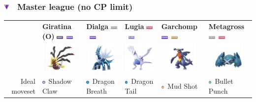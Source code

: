 \documentclass[8pt,aspectratio=169,compress]{beamer}
\newcommand{\flyingfull}{\includegraphics[height=0.15cm]{../../images/type/full/Flying.png}}
\newcommand{\ghostfull}{\includegraphics[height=0.15cm]{../../images/type/full/Ghost.png}}
\newcommand{\dragonfull}{\includegraphics[height=0.15cm]{../../images/type/full/Dragon.png}}
\newcommand{\groundfull}{\includegraphics[height=0.15cm]{../../images/type/full/Ground.png}}
\newcommand{\psychicfull}{\includegraphics[height=0.15cm]{../../images/type/full/Psychic.png}}
\newcommand{\steelfull}{\includegraphics[height=0.15cm]{../../images/type/full/Steel.png}}
\newcommand{\dragonsimp}{\includegraphics[height=0.15cm]{../../images/type/simplified/dragon.png}}
\newcommand{\ghostsimp}{\includegraphics[height=0.15cm]{../../images/type/simplified/ghost.png}}
\newcommand{\groundsimp}{\includegraphics[height=0.15cm]{../../images/type/simplified/ground.png}}
\newcommand{\steelsimp}{\includegraphics[height=0.15cm]{../../images/type/simplified/steel.png}}
\begin{document}
\begin{frame}
\frametitle{\includegraphics[width=0.3cm]{../../pve/guide/master_league.png} ~Master league (no CP limit)}

\begin{tiny}
\begin{block}{}
\begin{center}

\begin{tabular}{rp{2cm}p{2cm}p{2cm}p{2cm}p{2cm}} 
  & \textbf{Giratina (O)} \hfill \ghostfull~\dragonfull& \textbf{Dialga} \hfill \steelfull~\dragonfull & \textbf{Lugia} \hfill\psychicfull~\flyingfull &\textbf{Garchomp} \hfill\dragonfull~\groundfull&\textbf{Metagross} \hfill\steelfull~\psychicfull \\ 
  & \multicolumn{1}{c}{\includegraphics[width=1.5cm]{../../images/pokemon/giratina_o}} &  \multicolumn{1}{c}{\includegraphics[width=1.5cm]{../../images/pokemon/dialga} } & \multicolumn{1}{c}{\includegraphics[width=1.5cm]{../../images/pokemon/lugia} } & \multicolumn{1}{c}{\includegraphics[width=1.5cm]{../../images/pokemon/garchomp} } & \multicolumn{1}{c}{\includegraphics[width=1.5cm]{../../images/pokemon/metagross} }  \\ \hline 
   \multirow{3}{*}{Ideal moveset}  & \ghostsimp~Shadow Claw & \dragonsimp~Dragon Breath & \dragonsimp~Dragon Tail & \groundsimp~Mud Shot& \steelsimp~Bullet Punch \\

\end{tabular}
\end{center}
\end{block}
\end{tiny}
\end{frame}
\end{document}
